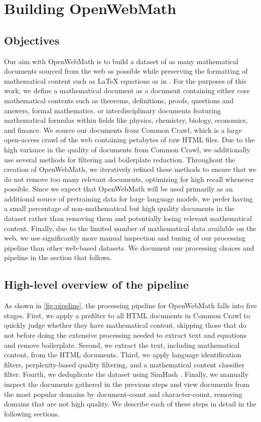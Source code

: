 \section{Building OpenWebMath}

\subsection{Objectives}

Our aim with OpenWebMath is to build a dataset of as many mathematical documents sourced from the web as possible while preserving the formatting of mathematical content such as \LaTeX{} equations as in \citet{lewkowycz2022solving}. For the purposes of this work, we define a mathematical document as a document containing either core mathematical contents such as theorems, definitions, proofs, questions and answers, formal mathematics, or interdisciplinary documents featuring mathematical formulas within fields like physics, chemistry, biology, economics, and finance. We source our documents from Common Crawl, which is a large open-access crawl of the web containing petabytes of raw HTML files. Due to the high variance in the quality of documents from Common Crawl, we additionally use several methods for filtering and boilerplate reduction. Throughout the creation of OpenWebMath, we iteratively refined these methods to ensure that we do not remove too many relevant documents, optimizing for high recall whenever possible. Since we expect that OpenWebMath will be used primarily as an additional source of pretraining data for large language models, we prefer having a small percentage of non-mathematical but high quality documents in the dataset rather than removing them and potentially losing relevant mathematical content. Finally, due to the limited number of mathematical data available on the web, we use significantly more manual inspection and tuning of our processing pipeline than other web-based datasets. We document our processing choices and pipeline in the section that follows.

\subsection{High-level overview of the pipeline}



As shown in \autoref{fig:pipeline}, the processing pipeline for OpenWebMath falls into five stages. First, we apply a prefilter to all HTML documents in Common Crawl to quickly judge whether they have mathematical content, skipping those that do not before doing the extensive processing needed to extract text and equations and remove boilerplate. Second, we extract the text, including mathematical content, from the HTML documents. Third, we apply language identification filters, perplexity-based quality filtering, and a mathematical content classifier filter. Fourth, we deduplicate the dataset using SimHash \citep{manku2007near}. Finally, we manually inspect the documents gathered in the previous steps and view documents from the most popular domains by document-count and character-count, removing domains that are not high quality. We describe each of these steps in detail in the following sections.


